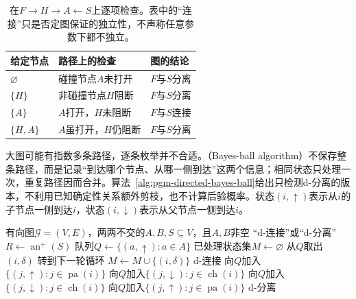 \begin{table}[htbp]
  \centering
  \begin{tabularx}{\linewidth}{@{}lXX@{}}
    \toprule
    给定节点 & 路径上的检查 & 图的结论 \\
    \midrule
    $\varnothing$ & 碰撞节点$A$未打开 & $F$与$S$分离 \\
    $\{H\}$ & 非碰撞节点$H$阻断 & $F$与$S$分离 \\
    $\{A\}$ & $A$打开，$H$未阻断 & $F$与$S$连接 \\
    $\{H,A\}$ & $A$虽打开，$H$仍阻断 & $F$与$S$分离 \\
    \bottomrule
  \end{tabularx}
  \caption{在$F\to H\to A\leftarrow S$上逐项检查。表中的“连接”只是否定图保证的独立性，不声称任意参数下都不独立。}
  \label{tab:pgm-directed-path-tests}
\end{table}
\FloatBarrier

大图可能有指数多条路径，逐条枚举并不合适。（Bayes-ball algorithm）不保存整条路径，而是记录“到达哪个节点、从哪一侧到达”这两个信息；相同状态只处理一次，重复路径因而合并。算法~\ref{alg:pgm-directed-bayes-ball}给出只检测d-分离的版本，不利用已知确定性关系额外剪枝，也不计算后验概率。状态$(i,\uparrow)$表示从$i$的子节点一侧到达$i$，状态$(i,\downarrow)$表示从父节点一侧到达$i$。

\begin{algorithm}
  \label{alg:pgm-directed-bayes-ball}
  \begin{algorithmic}[1]
    \Require 有向图$\mathcal{G}=(V,E)$，两两不交的$A,B,S\subseteq V$，且$A,B$非空
    \Ensure “d-连接”或“d-分离”
    \State $R\gets\operatorname{an}^{+}(S)$
    \State 队列$Q\gets\{(a,\uparrow):a\in A\}$
    \State 已处理状态集$M\gets\varnothing$
      \State 从$Q$取出$(i,\delta)$
        \State 转到下一轮循环
      \EndIf
      \State $M\gets M\cup\{(i,\delta)\}$
        \State \Return d-连接
      \EndIf
        \State 向$Q$加入$\{(j,\uparrow):j\in\operatorname{pa}(i)\}$
        \State 向$Q$加入$\{(j,\downarrow):j\in\operatorname{ch}(i)\}$
      \ElsIf{$\delta=\downarrow$}
          \State 向$Q$加入$\{(j,\downarrow):j\in\operatorname{ch}(i)\}$
        \EndIf
          \State 向$Q$加入$\{(j,\uparrow):j\in\operatorname{pa}(i)\}$
        \EndIf
      \EndIf
    \EndWhile
    \State \Return d-分离
  \end{algorithmic}
\end{algorithm}

